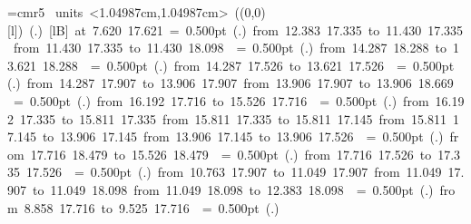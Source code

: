 \font\thinlinefont=cmr5
%
\begingroup\makeatletter\ifx\SetFigFont\undefined%
\gdef\SetFigFont#1#2#3#4#5{%
  \reset@font\fontsize{#1}{#2pt}%
  \fontfamily{#3}\fontseries{#4}\fontshape{#5}%
  \selectfont}%
\fi\endgroup%
\mbox{\beginpicture
\setcoordinatesystem units <1.04987cm,1.04987cm>
\unitlength=1.04987cm
\linethickness=1pt
\setplotsymbol ({\makebox(0,0)[l]{\tencirc{}}})
\setshadesymbol ({\thinlinefont .})
\setlinear
%
%
 [lB] at  7.620 17.621
%
%
\linethickness= 0.500pt
\setplotsymbol ({\thinlinefont .})
{\color[rgb]{0,0,0}\putrule from 12.383 17.335 to 11.430 17.335
\putrule from 11.430 17.335 to 11.430 18.098
}%
%
%
\linethickness= 0.500pt
\setplotsymbol ({\thinlinefont .})
{\color[rgb]{0,0,0}\putrule from 14.287 18.288 to 13.621 18.288
}%
%
%
\linethickness= 0.500pt
\setplotsymbol ({\thinlinefont .})
{\color[rgb]{0,0,0}\putrule from 14.287 17.526 to 13.621 17.526
}%
%
%
\linethickness= 0.500pt
\setplotsymbol ({\thinlinefont .})
{\color[rgb]{0,0,0}\putrule from 14.287 17.907 to 13.906 17.907
\putrule from 13.906 17.907 to 13.906 18.669
}%
%
%
\linethickness= 0.500pt
\setplotsymbol ({\thinlinefont .})
{\color[rgb]{0,0,0}\putrule from 16.192 17.716 to 15.526 17.716
}%
%
%
\linethickness= 0.500pt
\setplotsymbol ({\thinlinefont .})
{\color[rgb]{0,0,0}\putrule from 16.192 17.335 to 15.811 17.335
\putrule from 15.811 17.335 to 15.811 17.145
\putrule from 15.811 17.145 to 13.906 17.145
\putrule from 13.906 17.145 to 13.906 17.526
}%
%
%
\linethickness= 0.500pt
\setplotsymbol ({\thinlinefont .})
{\color[rgb]{0,0,0}\putrule from 17.716 18.479 to 15.526 18.479
}%
%
%
\linethickness= 0.500pt
\setplotsymbol ({\thinlinefont .})
{\color[rgb]{0,0,0}\putrule from 17.716 17.526 to 17.335 17.526
}%
%
%
\linethickness= 0.500pt
\setplotsymbol ({\thinlinefont .})
{\color[rgb]{0,0,0}\putrule from 10.763 17.907 to 11.049 17.907
\putrule from 11.049 17.907 to 11.049 18.098
\putrule from 11.049 18.098 to 12.383 18.098
}%
%
%
\linethickness= 0.500pt
\setplotsymbol ({\thinlinefont .})
{\color[rgb]{0,0,0}\putrule from  8.858 17.716 to  9.525 17.716
}%
%
%
\linethickness= 0.500pt
\setplotsymbol ({\thinlinefont .})
}
